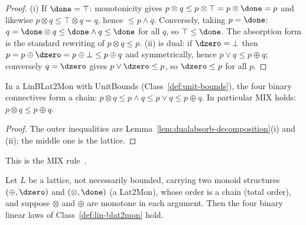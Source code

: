 \begin{proof}
\leanok
(i) If $\done = \top$: monotonicity gives
$p \otimes q \le p \otimes \top = p \otimes \done = p$ and likewise
$p \otimes q \le \top \otimes q = q$, hence $\le p \wedge q$. Conversely,
taking $p = \done$: $q = \done \otimes q \le \done \wedge q \le \done$
for all $q$, so $\top \le \done$. The absorption form is the standard
rewriting of $p \otimes q \le p$. (ii) is dual: if $\dzero = \bot$ then
$p = p \oplus \dzero = p \oplus \bot \le p \oplus q$ and symmetrically,
hence $p \vee q \le p \oplus q$; conversely $q = \dzero$ gives
$p \vee \dzero \le p$, so $\dzero \le p$ for all $p$.
\end{proof}

\begin{lemma}
\label{lem:mix}
\leanok
In a LinBLat2Mon with UnitBounds (Class~\ref{def:unit-bounds}),
the four binary connectives form a chain:
$p \otimes q \le p \wedge q \le p \vee q \le p \oplus q$. In particular
MIX holds: $p \otimes q \le p \oplus q$.
\end{lemma}

\begin{proof}
\leanok
The outer inequalities are Lemma~\ref{lem:dualabsorb-decomposition}(i)
and (ii); the middle one is the lattice.
\end{proof}

This is the MIX rule~\citep{girardLinearLogic1987}.

\begin{theorem}
\label{thm:chain-lin}
\leanok
Let $L$ be a lattice, not necessarily bounded, carrying two monoid
structures $(\oplus,\dzero)$ and $(\otimes,\done)$ (a Lat2Mon), whose
order is a chain (total order), and suppose $\otimes$ and $\oplus$ are
monotone in each argument. Then the four binary linear laws of
Class~\ref{def:lin-blat2mon} hold.
\end{theorem}

